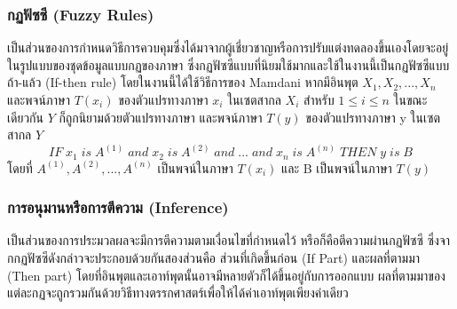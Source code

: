 \subsubsection{กฏฟัซซี (Fuzzy Rules) \cite{Sansanee}}
เป็นส่วนของการกำหนดวิธีการควบคุมซึ่งได้มาจากผู้เชี่ยวชาญหรือการปรับแต่งทดลองขึ้นเองโดยจะอยู่ในรูปแบบของชุดข้อมูลแบบกฏของภาษา ซึ่งกฏฟัซซีแบบที่นิยมใช้มากและใช้ในงานนี้เป็นกฏฟัซซีแบบ ถ้า-แล้ว (If-then rule)
โดยในงานนี้ได้ใช้วิธีการของ Mamdani หากมีอินพุต \(X_{1},X_{2},...,X_{n}\) และพจน์ภาษา \(T(x_{i})\) ของตัวแปรทางภาษา \(x_{i}\) ในเซตสากล \(X_{i}\) สำหรับ \(1 \le i \le n\) ในขณะเดียวกัน \(Y\) ก็ถูกนิยามด้วยตัวแปรทางภาษา และพจน์ภาษา \(T(y)\) ของตัวแปรทางภาษา y ในเซตสากล \(Y\)
\[ IF\; x_{1}\; is\; A^{(1)}\; and\; x_{2}\; is\; A^{(2)}\; and\; ... \; and\; x_{n}\; is\; A^{(n)}\; THEN\; y\; is\; B \]
โดยที่ \(A^{(1)},A^{(2)},...,A^{(n)}\) เป็นพจน์ในภาษา \(T(x_{i})\) และ B เป็นพจน์ในภาษา \(T(y)\)

\subsubsection{การอนุมานหรือการตีความ (Inference) \cite{Sansanee}}
เป็นส่วนของการประมวลผลจะมีการตีความตามเงื่อนไขที่กำหนดไว้ หรือก็คือตีความผ่านกฏฟัซซี ซึ่งจากกฏฟัซซีดังกล่าวจะประกอบด้วยกันสองส่วนคือ ส่วนที่เกิดขึ้นก่อน (If Part) และผลที่ตามมา (Then part) โดยที่อินพุตและเอาท์พุตนั้นอาจมีหลายตัวก็ได้ขึ้นอยู่กับการออกแบบ ผลที่ตามมาของแต่ละกฏจะถูกรวมกันด้วยวิธีทางตรรกศาสตร์เพื่อให้ได้ค่าเอาท์พุตเพียงค่าเดียว

